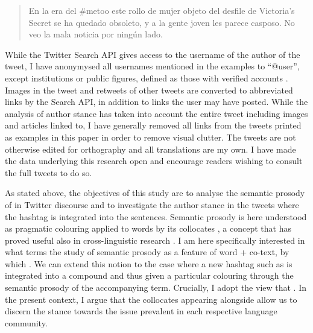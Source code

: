 \documentclass[output=paper,english,spanish,german,english]{langsci/langscibook}
\begin{document}
\begin{quote}\sffamily
  En la era del \#metoo este rollo de mujer objeto del desfile de Victoria's Secret se ha quedado obsoleto, y a la gente joven les parece casposo. No veo la mala noticia por ningún lado.
\end{quote}

\noindent While the Twitter Search API gives access to the username of the author of the tweet, I have anonymysed all usernames mentioned in the examples to \enquote{@user}, except institutions or public figures, defined as those with verified accounts \parencite{twitter19}. Images in the tweet and retweets of other tweets are converted to abbreviated links by the Search API, in addition to links the user may have posted. While the analysis of author stance has taken into account the entire tweet including images and articles linked to, I have generally removed all links from the tweets printed as examples in this paper in order to remove visual clutter. The tweets are not otherwise edited for orthography and all translations are my own. I have made the data underlying this research open and encourage readers wishing to consult the full tweets to do so. %

As stated above, the objectives of this study are to analyse the semantic pros\-o\-dy of \mt in Twitter discourse and to investigate the author stance in the tweets where the \mt hashtag is integrated into the sentences. Semantic prosody is here understood as pragmatic colouring applied to words by its collocates \parencites[158--159]{louw93}{stewart10}[13--14]{vessey13}, a concept that has proved useful also in cross-linguistic research \parencite{lewandowska96}. I am here specifically interested in what \textcite[61]{stewart10} terms the study of semantic prosody as a feature of word + co-text, by which . We can extend this notion to the case where a new hashtag such as \mt is integrated into a compound and thus given a particular colouring through the semantic prosody of the accompanying term. Crucially, I adopt the view that . In the present context, I argue that the collocates appearing alongside \mt allow us to discern the stance towards the issue prevalent in each respective language community.
\end{document}

